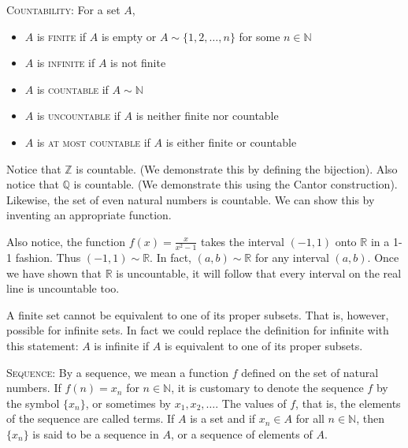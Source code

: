 \begin{definition}\textsc{Countability:}  For a set $A$,
\begin{itemize}
	\item $A$ is \textsc{finite} if $A$ is empty or $A\sim \{1, 2, \ldots, n\}$ for some $n \in \mathbb{N}$ 
	\item $A$ is \textsc{infinite} if $A$ is not finite
	\item $A$ is \textsc{countable} if $A \sim \mathbb{N}$
	\item $A$ is \textsc{uncountable} if $A$ is neither finite nor countable
	\item $A$ is \textsc{at most countable} if $A$ is either finite or countable
	
\end{itemize}\end{definition}

Notice that $\mathbb{Z}$ is countable.  (We demonstrate this by defining the bijection). 
Also notice that $\mathbb{Q}$ is countable. (We demonstrate this using the Cantor construction).  Likewise, the set of even natural numbers is countable.  We can show this by inventing an appropriate function.


Also notice,  the function $f(x) = \frac{x}{x^2 - 1}$ takes the interval $(-1,1)$ onto $\mathbb{R}$ in a 1-1 fashion.   Thus $(-1,1) \sim \mathbb{R}$.   In fact, $(a,b) \sim \mathbb{R}$ for any interval $(a,b)$.      Once we have shown that $\mathbb{R}$ is uncountable, it will follow that every interval on the real line is uncountable too.



A finite set cannot be equivalent to one of its proper subsets.   That is, however, possible for infinite sets.  In fact we could replace the definition for infinite with this statement:  $A$ is infinite if $A$ is equivalent to one of its proper subsets.
\bigskip


\begin{definition}\textsc{Sequence:}  By a sequence, we mean a function $f$ defined on the set of natural numbers.   If $f(n) = x_{n}$ for $n \in \mathbb{N}$, it is customary to denote the sequence $f$ by the symbol $\{x_{n}\}$, or sometimes by $x_{1}, x_{2}, \ldots$. The values of $f$, that is, the elements of the sequence are called terms.  If $A$ is a set and if $x_{n} \in A$ for all $n \in \mathbb{N}$, then $\{x_{n}\}$ is said to be a sequence in $A$, or a sequence of elements of $A$.
\end{definition}


